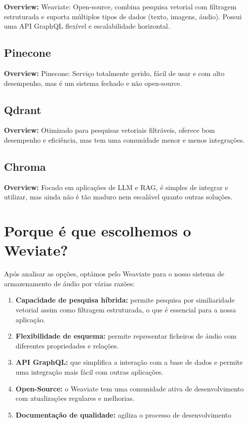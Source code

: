 \documentclass{article}
\begin{document}
\textbf{Overview:} Weaviate: Open-source, combina pesquisa vetorial com filtragem estruturada e suporta múltiplos tipos de dados (texto, imagens, áudio). Possui uma API GraphQL flexível e escalabilidade horizontal.


\subsection{Pinecone}

\textbf{Overview:} Pinecone: Serviço totalmente gerido, fácil de usar e com alto desempenho, mas é um sistema fechado e não open-source.

\subsection{Qdrant}

\textbf{Overview:} Otimizado para pesquisas vetoriais filtráveis, oferece bom desempenho e eficiência, mas tem uma comunidade menor e menos integrações.


\subsection{Chroma}

\textbf{Overview:} Focado em aplicações de LLM e RAG, é simples de integrar e utilizar, mas ainda não é tão maduro nem escalável quanto outras soluções.


\section{Porque é que escolhemos o Weviate?}

Após analisar as opções, optámos pelo Weaviate para o nosso sistema de armazenamento de áudio por várias razões:

\begin{enumerate}
    \item \textbf{Capacidade de pesquisa híbrida:} permite pesquisa por similiaridade vetorial assim como filtragem estruturada, o que é essencial para a nossa aplicação.
    
    \item \textbf{Flexibilidade de esquema:} permite representar ficheiros de áudio com diferentes propriedades e relações.
    
    \item \textbf{API GraphQL:} que simplifica a interação com a base de dados e permite uma integração mais fácil com outras aplicações.
    
    \item \textbf{Open-Source:} o Weaviate tem uma comunidade ativa de desenvolvimento com atualizações regulares e melhorias. 
        
    \item \textbf{Documentação de qualidade:} agiliza o processo de desenvolvimento
\end{enumerate}
\end{document}
